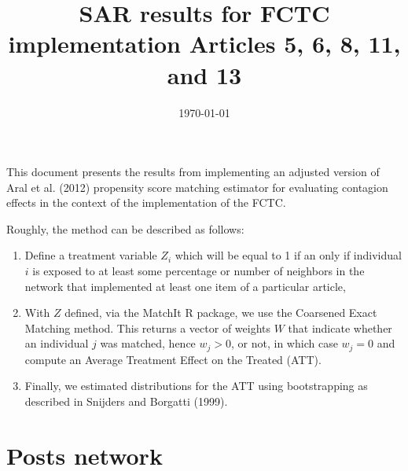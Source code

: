 \documentclass[10pt]{article}
\title{SAR results for FCTC implementation Articles 5, 6, 8, 11, and 13}
\date{\today}
\begin{document}
\maketitle
\tableofcontents

This document presents the results from implementing an adjusted version of Aral et al. (2012)
propensity score matching estimator for evaluating contagion effects in the context of
the implementation of the FCTC.

Roughly, the method can be described as follows:

\begin{enumerate}
\item Define a treatment variable $Z_i$ which will be equal to 1 if an only
if individual $i$ is exposed to at least some percentage or number of neighbors
in the network that implemented at least one item of a particular article,
\item With $Z$ defined, via the MatchIt R package, we use the Coarsened
Exact Matching method. This returns a vector of weights $W$ that indicate whether
an individual $j$ was matched, hence $w_j>0$, or not, in which case $w_j=0$ and
compute an Average Treatment Effect on the Treated (ATT).
\item Finally, we estimated distributions for the ATT using bootstrapping
as described in Snijders and Borgatti (1999).
\end{enumerate}

\section{Posts network}
\end{document}

